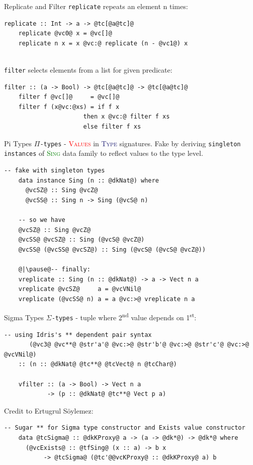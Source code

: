 \documentclass[xcolor={usenames,dvipsnames}]{beamer}
\newcommand{\htycon}[1]{\textcolor{MidnightBlue}{\textsc{#1}}}
\newcommand{\hvalcon}[1]{\textcolor{Red}{\textsc{#1}}}
\newcommand{\htyfam}[1]{\textcolor{Green}{\textsc{#1}}}
\begin{document}
\begin{frame}[fragile]{Replicate and Filter}
  \texttt{replicate} repeats an element n times:
  \begin{lstlisting}[style=hask]
    replicate :: Int -> a -> @tc[@a@tc]@
    replicate @vc0@ x = @vc[]@
    replicate n x = x @vc:@ replicate (n - @vc1@) x
  \end{lstlisting}

  \ \\
  \pause
  \texttt{filter} selects elements from a list for given predicate:
  \begin{lstlisting}[style=hask]
    filter :: (a -> Bool) -> @tc[@a@tc]@ -> @tc[@a@tc]@
    filter f @vc[]@     = @vc[]@
    filter f (x@vc:@xs) = if f x
                      then x @vc:@ filter f xs
                      else filter f xs
  \end{lstlisting}
\end{frame}

\begin{frame}[fragile]{Pi Types}
  \texttt{$\Pi$-types} - \hvalcon{Values} in \htycon{Type} signatures. Fake by deriving \texttt{singleton instances} of \htyfam{Sing} data family to reflect values to the type level.
  \begin{lstlisting}[style=hask]
    -- fake with singleton types
    data instance Sing (n :: @dkNat@) where
      @vcSZ@ :: Sing @vcZ@
      @vcSS@ :: Sing n -> Sing (@vcS@ n)

    -- so we have
    @vcSZ@ :: Sing @vcZ@
    @vcSS@ @vcSZ@ :: Sing (@vcS@ @vcZ@)
    @vcSS@ (@vcSS@ @vcSZ@) :: Sing (@vcS@ (@vcS@ @vcZ@))

    @|\pause@-- finally:
    vreplicate :: Sing (n :: @dkNat@) -> a -> Vect n a
    vreplicate @vcSZ@     a = @vcVNil@
    vreplicate (@vcSS@ n) a = a @vc:>@ vreplicate n a
  \end{lstlisting}
\end{frame}

\begin{frame}[fragile]{Sigma Types}
  \texttt{$\Sigma$-types} - tuple where 2\textsuperscript{nd} value depends on 1\textsuperscript{st}:
  \begin{lstlisting}[style=hask]
    -- using Idris's ** dependent pair syntax
       (@vc3@ @vc**@ @str'a'@ @vc:>@ @str'b'@ @vc:>@ @str'c'@ @vc:>@ @vcVNil@)
    :: (n :: @dkNat@ @tc**@ @tcVect@ n @tcChar@)

    vfilter :: (a -> Bool) -> Vect n a
            -> (p :: @dkNat@ @tc**@ Vect p a)
  \end{lstlisting}

  \pause
  Credit to Ertugrul S\"oylemez: 
  \begin{lstlisting}[style=hask]
    -- Sugar ** for Sigma type constructor and Exists value constructor
    data @tcSigma@ :: @dkKProxy@ a -> (a -> @dk*@) -> @dk*@ where
      (@vcExists@ :: @tfSing@ (x :: a) -> b x
           -> @tcSigma@ (@tc'@@vcKProxy@ :: @dkKProxy@ a) b
  \end{lstlisting}
\end{frame}
\end{document}
